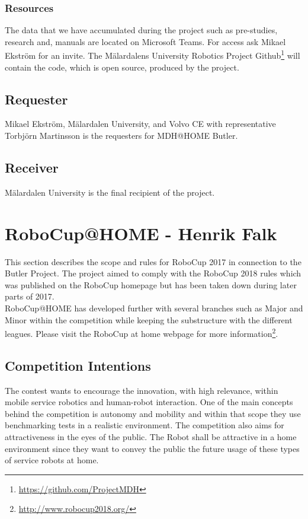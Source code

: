 \subsubsection{Resources}
The data that we have accumulated during the project such as pre-studies, research and, manuals are located on Microsoft Teams. For access ask Mikael Ekström for an invite. The Mälardalens University Robotics Project Github\footnote{\url{https://github.com/ProjectMDH}} will contain the code, which is open source, produced by the project.


\subsection{Requester}
Mikael Ekström, Mälardalen University, and Volvo CE with representative Torbjörn Martinsson is the requesters for MDH@HOME Butler.

\subsection{Receiver}
Mälardalen University is the final recipient of the project.


\section{RoboCup@HOME - Henrik Falk}

This section describes the scope and rules for RoboCup 2017 in connection to the Butler Project. The project aimed to comply with the RoboCup 2018 rules which was published on the RoboCup homepage but has been taken down during later parts of 2017.\\
\indent RoboCup@HOME has developed further with several branches such as Major and Minor within the competition while keeping the substructure with the different leagues. Please visit the RoboCup at home webpage for more information\footnote{\url{http://www.robocup2018.org/}}.

\subsection{Competition Intentions}
The contest wants to encourage the innovation, with high relevance, within mobile service robotics and human-robot interaction. One of the main concepts behind the competition is autonomy and mobility and within that scope they use benchmarking tests in a realistic environment. The competition also aims for attractiveness in the eyes of the public. The Robot shall be attractive in a home environment since they want to convey the public the future usage of these types of service robots at home.

